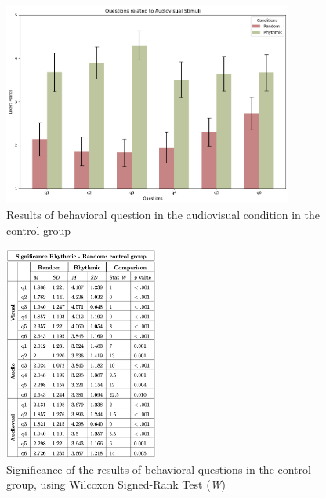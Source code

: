 \begin{figure}[H]
    \centering
    \includegraphics[width=0.85\textwidth]{bar_plots/plotbar_audiovisual_h.png}
    \caption{Results of behavioral question in the audiovisual condition in the control group}
    \label{fig: bar_audiovisual_control} 
\end{figure} 
\begin{figure}[H]
    \centering
    \includegraphics[width=0.45\textwidth]{significance_tables/control_group.png}
    \caption{Significance of the results of behavioral questions in the control group, using Wilcoxon Signed-Rank Test (\textit{W})}
    \label{fig: significance_control_pop} 
\end{figure} 

\clearpage
